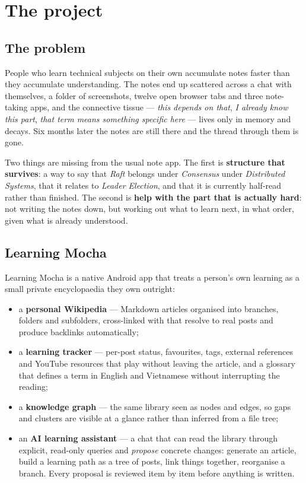 \section{The project}
\label{sec:intro}

\subsection{The problem}

People who learn technical subjects on their own accumulate notes faster than they accumulate
understanding. The notes end up scattered across a chat with themselves, a folder of screenshots, twelve
open browser tabs and three note-taking apps, and the connective tissue --- \emph{this depends on that},
\emph{I already know this part}, \emph{that term means something specific here} --- lives only in memory
and decays. Six months later the notes are still there and the thread through them is gone.

Two things are missing from the usual note app. The first is \textbf{structure that survives}: a way to
say that \emph{Raft} belongs under \emph{Consensus} under \emph{Distributed Systems}, that it relates to
\emph{Leader Election}, and that it is currently half-read rather than finished. The second is
\textbf{help with the part that is actually hard}: not writing the notes down, but working out what to
learn next, in what order, given what is already understood.

\subsection{Learning Mocha}

Learning Mocha is a native Android app that treats a person's own learning as a small private
encyclopaedia they own outright:

\begin{itemize}
  \item a \textbf{personal Wikipedia} --- Markdown articles organised into branches, folders and
        subfolders, cross-linked with  that resolve to real posts and produce
        backlinks automatically;
  \item a \textbf{learning tracker} --- per-post status, favourites, tags, external references and
        YouTube resources that play without leaving the article, and a glossary that defines a term in
        English and Vietnamese without interrupting the reading;
  \item a \textbf{knowledge graph} --- the same library seen as nodes and edges, so gaps and clusters are
        visible at a glance rather than inferred from a file tree;
  \item an \textbf{AI learning assistant} --- a chat that can read the library through explicit,
        read-only queries and \emph{propose} concrete changes: generate an article, build a learning path
        as a tree of posts, link things together, reorganise a branch. Every proposal is reviewed
        item by item before anything is written.
\end{itemize}

